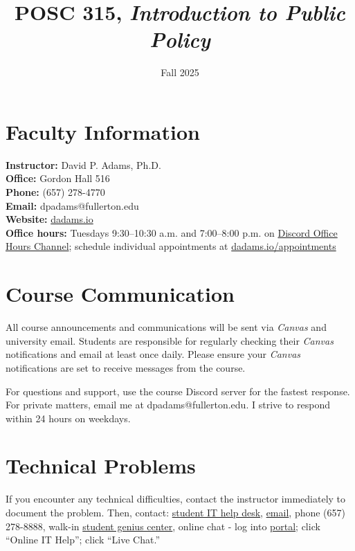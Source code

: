 \documentclass[12pt]{article}     %
\title{POSC 315, \textit{Introduction to Public Policy}} %
\author{}                         %
\date{Fall 2025}                  %
\begin{document}
\maketitle

\section*{Faculty Information}
\noindent \textbf{Instructor:} David P. Adams, Ph.D. \\
\noindent \textbf{Office:} Gordon Hall 516 \\
\noindent \textbf{Phone:} (657) 278-4770 \\
\noindent \textbf{Email:} dpadams@fullerton.edu \\
\noindent \textbf{Website:} \href{https://dadams.io}{dadams.io} \\
\noindent \textbf{Office hours:} Tuesdays 9:30--10:30 a.m. and 7:00--8:00 p.m. on \href{https://discord.com/channels/1128747433636135113/1154048074172354600}{Discord Office Hours Channel}; schedule individual appointments at \href{https://dadams.io/appointments}{dadams.io/appointments}

\section*{Course Communication}
All course announcements and communications will be sent via \emph{Canvas} and university email. Students are responsible for regularly checking their \emph{Canvas} notifications and email at least once daily. Please ensure your \emph{Canvas} notifications are set to receive messages from the course.

For questions and support, use the course Discord server for the fastest response. For private matters, email me at dpadams@fullerton.edu. I strive to respond within 24 hours on weekdays.

\section*{Technical Problems}
If you encounter any technical difficulties, contact the instructor immediately to document the problem. Then, contact: \href{http://www.fullerton.edu/it/students/helpdesk/index.php}{student IT help desk}, \href{mailto:StudentITHelpDesk@fullerton.edu}{email}, phone (657) 278-8888, walk-in \href{http://www.fullerton.edu/it/students/sgc/index.php}{student genius center}, online chat - log into \href{http://my.fullerton.edu}{portal}; click ``Online IT Help''; click ``Live Chat.''
\end{document}
